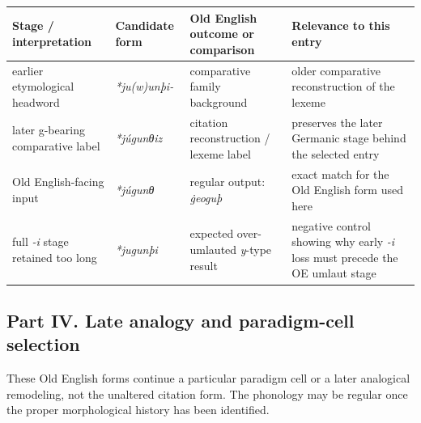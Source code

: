\documentclass[
  british,
  a4paper,
]{article}
\newcounter{none} %
\begin{document}
{\def\LTcaptype{none} %
\begin{longtable}[]{@{}
  >{\raggedright\arraybackslash}p{}
  >{\raggedright\arraybackslash}p{}
  >{\raggedright\arraybackslash}p{}
  >{\raggedright\arraybackslash}p{}@{}}
\toprule\noalign{}
\begin{minipage}[b]{\linewidth}\raggedright
Stage / interpretation
\end{minipage} & \begin{minipage}[b]{\linewidth}\raggedright
Candidate form
\end{minipage} & \begin{minipage}[b]{\linewidth}\raggedright
Old English outcome or comparison
\end{minipage} & \begin{minipage}[b]{\linewidth}\raggedright
Relevance to this entry
\end{minipage} \\
\midrule\noalign{}
\endhead
\bottomrule\noalign{}
\endlastfoot
earlier etymological headword & {\emph{*ju(w)unþi-}} & comparative
family background & older comparative reconstruction of the lexeme \\
later g-bearing comparative label & {\emph{*júgunθiz}} & citation
reconstruction / lexeme label & preserves the later Germanic stage
behind the selected entry \\
Old English-facing input & {\emph{*júgunθ}} & regular output:
{\emph{ġeoguþ}} & exact match for the Old English form used here \\
full \emph{-i} stage retained too long & {\emph{*jugunþi}} & expected
over-umlauted \emph{y}-type result & negative control showing why early
\emph{-i} loss must precede the OE umlaut stage \\
\end{longtable}
}

\clearpage

\subsection{Part IV. Late analogy and paradigm-cell
selection}\label{part-iv.-late-analogy-and-paradigm-cell-selection}

These Old English forms continue a particular paradigm cell or a later
analogical remodeling, not the unaltered citation form. The phonology
may be regular once the proper morphological history has been
identified.
\end{document}
